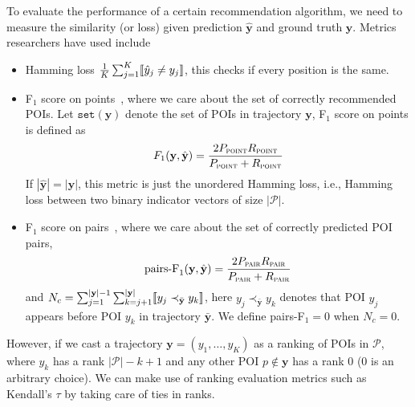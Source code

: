To evaluate the performance of a certain recommendation algorithm,
we need to measure the similarity (or loss) given prediction $\hat{\mathbf{y}}$ and ground truth $\mathbf{y}$.
Metrics researchers have used include
\begin{itemize}
\item Hamming loss $\frac{1}{K} \sum_{j=1}^K \llbracket \hat{y}_j \neq y_j \rrbracket$, this checks if every position is the same.

\item F$_1$ score on points~\cite{ijcai15}, where we care about the set of correctly recommended POIs. 
      Let $\texttt{set}(\mathbf{y})$ denote the set of POIs in trajectory $\mathbf{y}$, F$_1$ score on points is defined as
\begin{equation*}
F_1(\mathbf{y}, \hat{\mathbf{y}}) = \frac{2  P_{\textsc{point}}  R_{\textsc{point}}}{P_{\textsc{point}} + R_{\textsc{point}}}
\end{equation*}
If $| \hat{\mathbf{y}} | = | \mathbf{y} |$, this metric is just the unordered Hamming loss, 
i.e., Hamming loss between two binary indicator vectors of size $| \mathcal{P} |$.

\item F$_1$ score on pairs~\cite{cikm16paper}, where we care about the set of correctly predicted POI pairs,
\begin{equation*}
\text{pairs-F}_1(\mathbf{y}, \hat{\mathbf{y}}) = \frac{2 P_{\textsc{pair}} R_{\textsc{pair}}}{P_{\textsc{pair}} + R_{\textsc{pair}}}
\end{equation*}
and $N_c = \sum_{j=1}^{| \mathbf{y} | - 1} \sum_{k=j+1}^{| \mathbf{y} |} \llbracket y_j \prec_{\bar{\mathbf{y}}} y_k \rrbracket$,
here $y_j \prec_{\bar{\mathbf{y}}} y_k$ denotes that POI $y_j$ appears before POI $y_k$ in trajectory $\bar{\mathbf{y}}$.
We define pairs-F$_1 = 0$ when $N_c = 0$.

\end{itemize}

However, if we cast a trajectory $\mathbf{y} = (y_1,\dots,y_K)$ as a ranking of POIs in $\mathcal{P}$,
where $y_k$ has a rank $| \mathcal{P} | - k + 1$ and any other POI $p \notin \mathbf{y}$ has a rank $0$ ($0$ is an arbitrary choice).
We can make use of ranking evaluation metrics such as Kendall's $\tau$ by taking care of ties in ranks.

